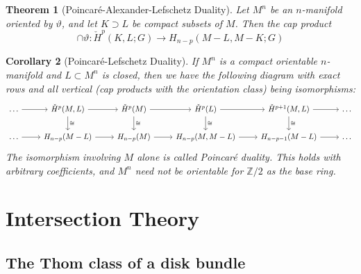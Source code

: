 \documentclass[reqno]{amsart}
\newtheorem{theorem}{Theorem}[section]
\newtheorem{corollary}[theorem]{Corollary}
\theoremstyle{definition}
\theoremstyle{remark}
\begin{document}
      \begin{theorem}[Poincaré-Alexander-Lefschetz Duality]
          \cite[Theorem 8.3]{Bredon}
          Let $M^{n}$ be an $n$-manifold oriented by
          $\vartheta$, and let $K \supset L$ be compact
          subsets of $M$. Then the cap product
          \[
          \cap \vartheta \colon
          \check{H}^{p}(K,L;G) \to H_{n-p}(M-L, M-K;G)
          \] 
      \end{theorem}

      \begin{corollary}[Poincaré-Lefschetz Duality]\cite[Corollary 8.4]{Bredon}
          If $M^{n}$ is a compact orientable $n$-manifold
          and $L \subset M^{n}$ is closed, then we have the following
          diagram with exact rows and all vertical (cap products
          with the orientation class) being isomorphisms:
          \begin{equation*}
          \begin{tikzcd}
              \ldots \ar[r] & \check{H}^{p}(M,L) \ar[r]
              \ar[d, "\cong"] & \check{H}^{p}(M)
              \ar[r] \ar[d, "\cong"] 
              & \check{H}^{p}(L) \ar[r] \ar[d, "\cong"] 
              & \check{H}^{p+1}(M,L)
              \ar[r] \ar[d, "\cong"] & \ldots \\
              \ldots \ar[r] & H_{n-p}(M-L) \ar[r] & 
              H_{n-p}(M) \ar[r] & H_{n-p}(M, M-L) \ar[r] &
              H_{n-p-1}(M-L) \ar[r] & \ldots
          \end{tikzcd}
          \end{equation*}
          The isomorphism involving $M$ alone is called
          \textit{Poincaré duality}. This holds
          with arbitrary coefficients, and 
          $M^{n}$ need not be orientable for
          $\mathbb{Z} / 2$ as the base ring.
      \end{corollary}



    
      



      


\section{Intersection Theory}

\subsection{The Thom class of a disk bundle}
\end{document}
